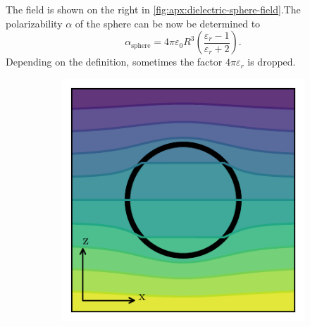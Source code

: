 The field is shown on the right in \cref{fig:apx:dielectric-sphere-field}.The polarizability $\alpha$ of the sphere can be now be determined to
\begin{equation}
  \alpha_\mathrm{sphere} = 4\pi \varepsilon_0 R^3 \left(\frac{\varepsilon_r - 1}{\varepsilon_r + 2}\right).
\end{equation}
Depending on the definition, sometimes the factor $4\pi\varepsilon_r$ is dropped.
\begin{figure}[!htbp]
  \centering
  \begin{subfigure}[b]{0.48\textwidth}
      \centering
      \includegraphics[width=\textwidth]{./../figures/potential-dielectric-sphere-small.pdf}
  \end{subfigure}
  \hfill
  \begin{subfigure}[b]{0.48\textwidth}
      \centering

\end{subfigure}
\end{figure}
